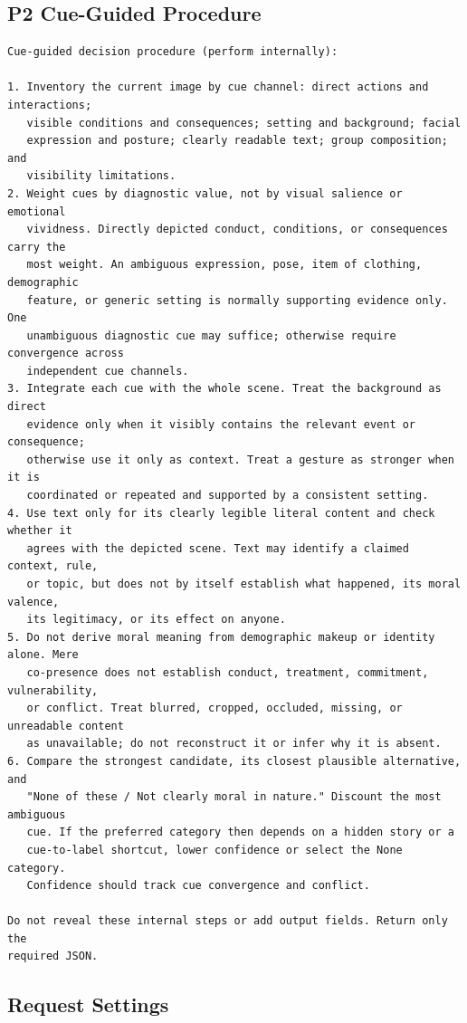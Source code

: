 \subsection{P2 Cue-Guided Procedure}

\begin{lstlisting}
Cue-guided decision procedure (perform internally):

1. Inventory the current image by cue channel: direct actions and interactions;
   visible conditions and consequences; setting and background; facial
   expression and posture; clearly readable text; group composition; and
   visibility limitations.
2. Weight cues by diagnostic value, not by visual salience or emotional
   vividness. Directly depicted conduct, conditions, or consequences carry the
   most weight. An ambiguous expression, pose, item of clothing, demographic
   feature, or generic setting is normally supporting evidence only. One
   unambiguous diagnostic cue may suffice; otherwise require convergence across
   independent cue channels.
3. Integrate each cue with the whole scene. Treat the background as direct
   evidence only when it visibly contains the relevant event or consequence;
   otherwise use it only as context. Treat a gesture as stronger when it is
   coordinated or repeated and supported by a consistent setting.
4. Use text only for its clearly legible literal content and check whether it
   agrees with the depicted scene. Text may identify a claimed context, rule,
   or topic, but does not by itself establish what happened, its moral valence,
   its legitimacy, or its effect on anyone.
5. Do not derive moral meaning from demographic makeup or identity alone. Mere
   co-presence does not establish conduct, treatment, commitment, vulnerability,
   or conflict. Treat blurred, cropped, occluded, missing, or unreadable content
   as unavailable; do not reconstruct it or infer why it is absent.
6. Compare the strongest candidate, its closest plausible alternative, and
   "None of these / Not clearly moral in nature." Discount the most ambiguous
   cue. If the preferred category then depends on a hidden story or a
   cue-to-label shortcut, lower confidence or select the None category.
   Confidence should track cue convergence and conflict.

Do not reveal these internal steps or add output fields. Return only the
required JSON.
\end{lstlisting}

\subsection{Request Settings}

